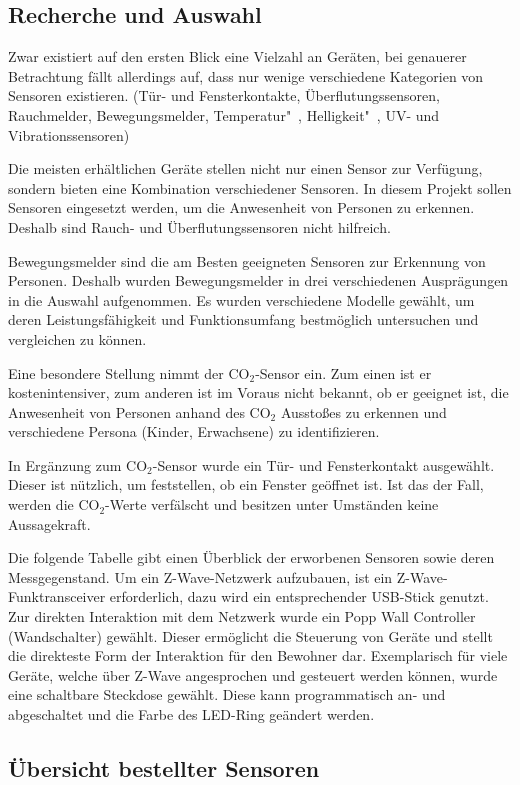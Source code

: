 \subsection{Recherche und Auswahl}
Zwar existiert auf den ersten Blick eine Vielzahl an Geräten, bei genauerer Betrachtung fällt allerdings auf, dass nur wenige verschiedene Kategorien von Sensoren existieren. (Tür- und Fensterkontakte, Überflutungssensoren, Rauchmelder, Bewegungsmelder, Temperatur"~, Helligkeit"~, UV- und Vibrationssensoren)

Die meisten erhältlichen Geräte stellen nicht nur einen Sensor zur Verfügung, sondern bieten eine Kombination verschiedener Sensoren. In diesem Projekt sollen Sensoren eingesetzt werden, um die Anwesenheit von Personen zu erkennen. Deshalb sind Rauch- und Überflutungssensoren nicht hilfreich.

Bewegungsmelder sind die am Besten geeigneten Sensoren zur Erkennung von Personen. Deshalb wurden Bewegungsmelder in drei verschiedenen Ausprägungen in die Auswahl aufgenommen. Es wurden verschiedene Modelle gewählt, um deren Leistungsfähigkeit und Funktionsumfang bestmöglich untersuchen und vergleichen zu können.

Eine besondere Stellung nimmt der CO$_2$-Sensor ein. Zum einen ist er kostenintensiver, zum anderen ist im Voraus nicht bekannt, ob er geeignet ist, die Anwesenheit von Personen anhand des CO$_2$ Ausstoßes zu erkennen und verschiedene Persona (Kinder, Erwachsene) zu identifizieren.

In Ergänzung zum CO$_2$-Sensor wurde ein Tür- und Fensterkontakt ausgewählt. Dieser ist nützlich, um feststellen, ob ein Fenster geöffnet ist. Ist das der Fall, werden die CO$_2$-Werte verfälscht und besitzen unter Umständen keine Aussagekraft.

Die folgende Tabelle gibt einen Überblick der erworbenen Sensoren sowie deren  Messgegenstand. Um ein Z-Wave-Netzwerk aufzubauen, ist ein Z-Wave-Funktransceiver erforderlich, dazu wird ein entsprechender USB-Stick genutzt. Zur direkten Interaktion mit dem Netzwerk wurde ein Popp Wall Controller (Wandschalter) gewählt. Dieser ermöglicht die Steuerung von Geräte und stellt die direkteste Form der Interaktion für den Bewohner dar. Exemplarisch für viele Geräte, welche über Z-Wave angesprochen und gesteuert werden können, wurde eine schaltbare Steckdose gewählt. Diese kann programmatisch an- und abgeschaltet und die Farbe des LED-Ring geändert werden.

\subsection{Übersicht bestellter Sensoren}

